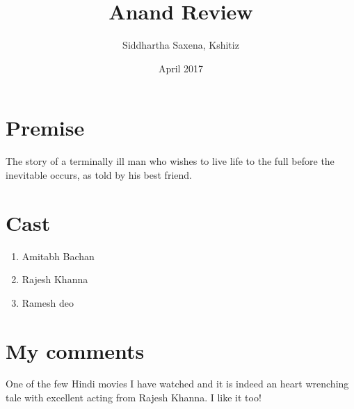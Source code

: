 \documentclass{article}
\title{Anand Review}
\author{Siddhartha Saxena, Kshitiz}
\date{April 2017}
\begin{document}
\maketitle
\section{Premise}
The story of a terminally ill man who wishes to live life to the full before the inevitable occurs, as told by his best friend.
\section{Cast}
\begin{enumerate}
	\item Amitabh Bachan
	\item Rajesh Khanna
	\item Ramesh deo
\end{enumerate}	
\section{My comments}
One of the few Hindi movies I have watched and it is indeed an heart wrenching tale with excellent acting from Rajesh Khanna.
I like it too!
\end{document}
